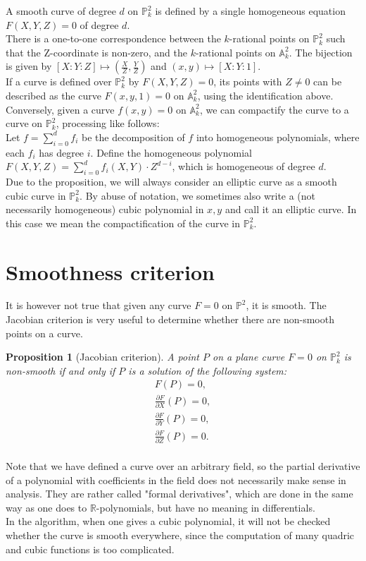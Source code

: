 \documentclass[a4paper,oneside,11pt]{article}
\newcommand{\bA}{\mathbb{A}}
\newcommand{\bP}{\mathbb{P}}
\newcommand{\bR}{\mathbb{R}}
\newtheorem{prop}[thm]{Proposition}
\theoremstyle{definition}
\begin{document}
A smooth curve of degree $d$ on $\bP^2_k$ is defined by a single homogeneous equation $F(X,Y,Z)=0$ of degree $d$. \\
There is a one-to-one correspondence between the $k$-rational points on $\bP^2_k$ such that the Z-coordinate is non-zero, and the $k$-rational points on $\bA^2_k$. The bijection is given by $[X:Y:Z]\mapsto (\frac{X}{Z}, \frac{Y}{Z})$ and $(x,y) \mapsto [X:Y:1]$.\\
If a curve is defined over $\bP^2_k$ by $F(X,Y,Z)=0$, its points with $Z\neq 0$ can be described as the curve $F(x,y,1)=0$ on $\bA^2_k$, using the identification above. Conversely, given a curve $f(x,y)=0$ on $\bA^2_k$, we can compactify the curve to a curve on $\bP^2_k$, processing like follows:\\
Let $f=\sum_{i=0}^d f_i$ be the decomposition of $f$ into homogeneous polynomials, where each $f_i$ has degree $i$. Define the homogeneous polynomial $F(X,Y,Z)=\sum_{i=0}^d f_i(X,Y)\cdot Z^{d-i}$, which is homogeneous of degree $d$.\\
Due to the proposition, we will always consider an elliptic curve as a smooth cubic curve in $\bP^2_k$. By abuse of notation, we sometimes also write a (not necessarily homogeneous) cubic polynomial in $x,y$ and call it an elliptic curve. In this case we mean the compactification of the curve in $\bP^2_k$.

\section{Smoothness criterion}
It is however not true that given any curve $F=0$ on $\bP^2$, it is smooth. The Jacobian criterion is very useful to determine whether there are non-smooth points on a curve.
\begin{prop}[Jacobian criterion]
	A point $P$ on a plane curve $F=0$ on $\bP^2_k$ is non-smooth if and only if $P$ is a solution of the following system:
	\begin{align*}
		F(P)=0,\\
		\frac{\partial F}{\partial X}(P)=0,\\
		\frac{\partial F}{\partial Y}(P)=0,\\
		\frac{\partial F}{\partial Z}(P)=0.\\
	\end{align*}
\end{prop}
Note that we have defined a curve over an arbitrary field, so the partial derivative of a polynomial with coefficients in the field does not necessarily make sense in analysis. They are rather called "formal derivatives", which are done in the same way as one does to $\bR$-polynomials, but have no meaning in differentials.\\
In the algorithm, when one gives a cubic polynomial, it will not be checked whether the curve is smooth everywhere, since the computation of many quadric and cubic functions is too complicated.
\end{document}
